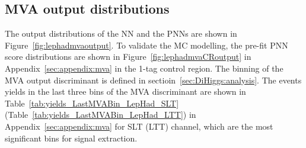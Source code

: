 \subsection{MVA output distributions}
The output distributions of the NN and the PNNs are shown in 
Figure~\ref{fig:lephadmvaoutput}. 
To validate the MC modelling, the pre-fit PNN score distributions are shown in 
Figure~\ref{fig:lephadmvaCRoutput} in Appendix~\ref{sec:appendix:mva} in the 1-tag control region. 
The binning of the MVA output discriminant is defined in sectioin~\ref{sec:DiHiggs:analysis}.
The events yields in the last three bins of the MVA discriminant are shown in 
Table~\ref{tab:yields_LastMVABin_LepHad_SLT} (Table~\ref{tab:yields_LastMVABin_LepHad_LTT}) 
in Appendix~\ref{sec:appendix:mva} for SLT (LTT) channel, which are the most significant bins
for signal extraction. 



